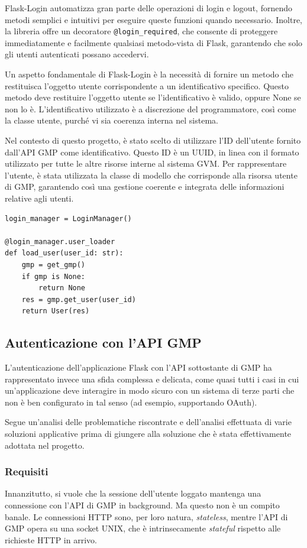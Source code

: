Flask-Login automatizza gran parte delle operazioni di login e logout, fornendo metodi semplici e intuitivi per eseguire queste funzioni quando necessario. Inoltre, la libreria offre un decoratore \texttt{@login\_required}, che consente di proteggere immediatamente e facilmente qualsiasi metodo-vista di Flask, garantendo che solo gli utenti autenticati possano accedervi.

Un aspetto fondamentale di Flask-Login è la necessità di fornire un metodo che restituisca l'oggetto utente corrispondente a un identificativo specifico. Questo metodo deve restituire l'oggetto utente se l'identificativo è valido, oppure None se non lo è. L'identificativo utilizzato è a discrezione del programmatore, così come la classe utente, purché vi sia coerenza interna nel sistema.

Nel contesto di questo progetto, è stato scelto di utilizzare l'ID dell'utente fornito dall'API GMP come identificativo. Questo ID è un UUID, in linea con il formato utilizzato per tutte le altre risorse interne al sistema GVM. Per rappresentare l'utente, è stata utilizzata la classe di modello che corrisponde alla risorsa utente di GMP, garantendo così una gestione coerente e integrata delle informazioni relative agli utenti.

\begin{lstlisting}[caption={User loader di Flask-Login}]
login_manager = LoginManager()

@login_manager.user_loader
def load_user(user_id: str):
    gmp = get_gmp()
    if gmp is None:
        return None
    res = gmp.get_user(user_id)
    return User(res)
\end{lstlisting}

\subsection{Autenticazione con l'API GMP}
L'autenticazione dell'applicazione Flask con l'API sottostante di GMP ha rappresentato invece una sfida complessa e delicata, come quasi tutti i casi in cui un'applicazione deve interagire in modo sicuro con un sistema di terze parti che non è ben configurato in tal senso (ad esempio, supportando OAuth).

Segue un'analisi delle problematiche riscontrate e dell'analisi effettuata di varie soluzioni applicative prima di giungere alla soluzione che è stata effettivamente adottata nel progetto.

\subsubsection{Requisiti}
Innanzitutto, si vuole che la sessione dell'utente loggato mantenga una connessione con l'API di GMP in background. Ma questo non è un compito banale. Le connessioni HTTP sono, per loro natura, \emph{stateless}, mentre l'API di GMP opera su una socket UNIX, che è intrinsecamente \emph{stateful} rispetto alle richieste HTTP in arrivo.

